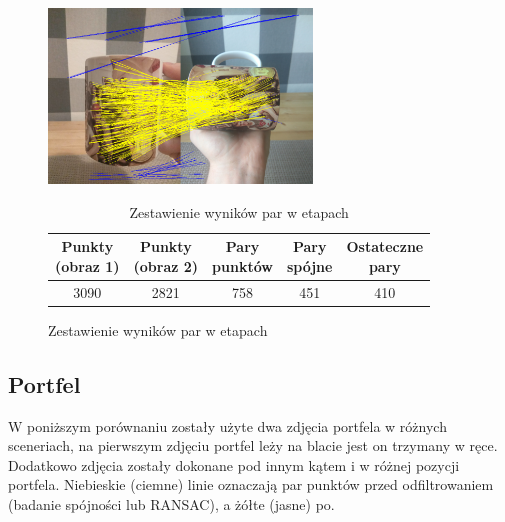 \documentclass[../main.tex]{subfiles}
\begin{document}
    \begin{figure}[H]
    \centering
    \begin{minipage}{.5\textwidth}
        \caption{Wynik metody RANSAC}
        \centering
        \includegraphics[width=7cm]{mug_pairs_ranscons_out}
    \end{minipage}%
    \begin{minipage}{.5\textwidth}
        \begin{table}[H]
        \caption{Zestawienie wyników par w etapach}
        \label{t:mug}
        \begin{center}
        \begin{tabular}{|c|c|c|c|c|} 
        \hline
        \thead{Punkty \\ (obraz 1)} & \thead{Punkty \\ (obraz 2)} & \thead{Pary \\ punktów} 
        & \thead{Pary \\ spójne} & \thead{Ostateczne \\ pary} \\
        \hline
        {3090} & {2821} & {758} & {451} & {410} \\
        \hline
        \end{tabular}
        \end{center}
        \end{table}
    \end{minipage}%
    \end{figure}
    
    \subsection{Portfel}
    W poniższym porównaniu zostały użyte dwa zdjęcia portfela w różnych sceneriach, na pierwszym zdjęciu portfel leży na blacie jest on trzymany w ręce. Dodatkowo zdjęcia zostały dokonane pod innym kątem i w różnej pozycji portfela. Niebieskie (ciemne)  linie oznaczają par punktów przed odfiltrowaniem (badanie spójności lub RANSAC), a żółte (jasne) po.
    
\end{document}
